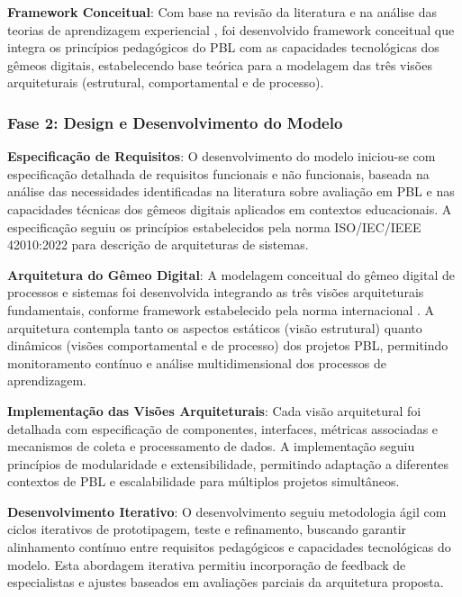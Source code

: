 \documentclass[12pt, a4paper, oneside]{abntex2}
\begin{document}
\textbf{Framework Conceitual}: Com base na revisão da literatura e na análise das teorias de aprendizagem experiencial \cite{kolb1984}, foi desenvolvido framework conceitual que integra os princípios pedagógicos do PBL \cite{duch2001} com as capacidades tecnológicas dos gêmeos digitais, estabelecendo base teórica para a modelagem das três visões arquiteturais (estrutural, comportamental e de processo).

\subsubsection{Fase 2: Design e Desenvolvimento do Modelo}

\textbf{Especificação de Requisitos}: O desenvolvimento do modelo iniciou-se com especificação detalhada de requisitos funcionais e não funcionais, baseada na análise das necessidades identificadas na literatura sobre avaliação em PBL \cite{guo2020, lavado2024} e nas capacidades técnicas dos gêmeos digitais aplicados em contextos educacionais. A especificação seguiu os princípios estabelecidos pela norma ISO/IEC/IEEE 42010:2022 \cite{iso42010} para descrição de arquiteturas de sistemas.

\textbf{Arquitetura do Gêmeo Digital}: A modelagem conceitual do gêmeo digital de processos e sistemas foi desenvolvida integrando as três visões arquiteturais fundamentais, conforme framework estabelecido pela norma internacional \cite{iso42010}. A arquitetura contempla tanto os aspectos estáticos (visão estrutural) quanto dinâmicos (visões comportamental e de processo) dos projetos PBL, permitindo monitoramento contínuo e análise multidimensional dos processos de aprendizagem.

\textbf{Implementação das Visões Arquiteturais}: Cada visão arquitetural foi detalhada com especificação de componentes, interfaces, métricas associadas e mecanismos de coleta e processamento de dados. A implementação seguiu princípios de modularidade e extensibilidade, permitindo adaptação a diferentes contextos de PBL e escalabilidade para múltiplos projetos simultâneos.

\textbf{Desenvolvimento Iterativo}: O desenvolvimento seguiu metodologia ágil com ciclos iterativos de prototipagem, teste e refinamento, buscando garantir alinhamento contínuo entre requisitos pedagógicos e capacidades tecnológicas do modelo. Esta abordagem iterativa permitiu incorporação de feedback de especialistas e ajustes baseados em avaliações parciais da arquitetura proposta.
\end{document}
